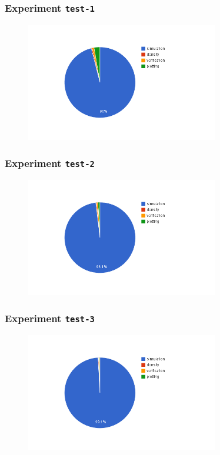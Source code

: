 \documentclass{parasim}
\begin{document}
\subsubsection{Experiment \texttt{test-1}}

\begin{figure}[H]
    \centering
    \includegraphics[width=0.75\textwidth]{1.0.0.M2/test-1.png}
\end{figure}

\subsubsection{Experiment \texttt{test-2}}

\begin{figure}[H]
    \centering
    \includegraphics[width=0.75\textwidth]{1.0.0.M2/test-2.png}
\end{figure}

\subsubsection{Experiment \texttt{test-3}}

\begin{figure}[H]
    \centering
    \includegraphics[width=0.75\textwidth]{1.0.0.M2/test-3.png}
\end{figure}
\end{document}
